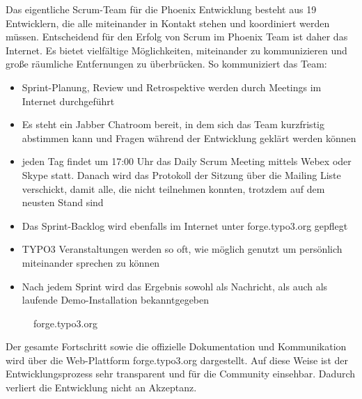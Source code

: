 Das eigentliche Scrum-Team für die Phoenix Entwicklung besteht aus 19 Entwicklern, die alle miteinander in Kontakt stehen und koordiniert werden müssen. Entscheidend für den Erfolg von Scrum im Phoenix Team ist daher das Internet. Es bietet vielfältige Möglichkeiten, miteinander zu kommunizieren und große räumliche Entfernungen zu überbrücken. So kommuniziert das Team:
\begin{itemize}
\item Sprint-Planung, Review und Retrospektive werden durch Meetings im Internet durchgeführt
\item Es steht ein Jabber Chatroom bereit, in dem sich das Team kurzfristig abstimmen kann und Fragen während der Entwicklung geklärt werden können
\item jeden Tag findet um 17:00 Uhr das Daily Scrum Meeting mittels Webex oder Skype statt. Danach wird das Protokoll der Sitzung über die Mailing Liste verschickt, damit alle, die nicht teilnehmen konnten, trotzdem auf dem neusten Stand sind
\item Das Sprint-Backlog wird ebenfalls im Internet unter forge.typo3.org gepflegt
\item TYPO3 Veranstaltungen werden so oft, wie möglich genutzt um persönlich miteinander sprechen zu können
\item Nach jedem Sprint wird das Ergebnis sowohl als Nachricht, als auch als laufende Demo-Installation bekanntgegeben \cite{bib:agiler-phoenix}
\end{itemize}

\begin{figure}[h]
	\centering
	\caption{forge.typo3.org \cite{bib:forge}}
	\label{forge}
\end{figure}
Der gesamte Fortschritt sowie die offizielle Dokumentation und Kommunikation wird über die Web-Plattform forge.typo3.org dargestellt. Auf diese Weise ist der Entwicklungsprozess sehr transparent und für die Community einsehbar. \cite{bib:scrumify} Dadurch verliert die Entwicklung nicht an Akzeptanz.

